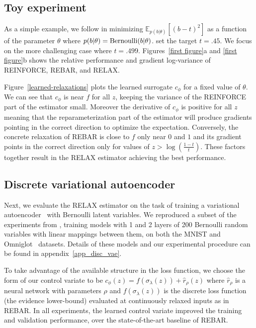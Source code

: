 \documentclass{article}
\newcommand{\RELAX}{{\textnormal{RELAX}}}
\begin{document}
\subsection{Toy experiment}
As a simple example, we follow \citet{tucker2017rebar} in minimizing $\mathbb{E}_{p(b|\theta)}[(b - t)^2]$ as a function of the parameter $\theta$ where {$p(b|\theta) = \textnormal{Bernoulli}(b|\theta)$}.
\citet{tucker2017rebar} set the target $t = .45$.
We focus on the more challenging case where $t = .499$.
Figures~\ref{first figure}a and \ref{first figure}b shows the relative performance and gradient log-variance of REINFORCE, REBAR, and RELAX.


Figure~\ref{learned-relaxations} plots the learned surrogate $c_\phi$ for a fixed value of $\theta$. We can see that $c_\phi$ is near $f$ for all $z$, keeping the variance of the REINFORCE part of the estimator small. Moreover the derivative of $c_\phi$ is positive for all $z$ meaning that the reparameterization part of the estimator will produce gradients pointing in the correct direction to optimize the expectation. Conversely, the concrete relaxation of REBAR is close to $f$ only near $0$ and $1$ and its gradient points in the correct direction only for values of $z > \log (\frac{1-t}{t})$. These factors together result in the RELAX estimator achieving the best performance. 

\subsection{Discrete variational autoencoder}
Next, we evaluate the \RELAX{} estimator on the task of training a variational autoencoder~\citep{kingma2013autoencoding, rezende2014stochastic} with Bernoulli latent variables.
We reproduced a subset of the experiments from \citet{tucker2017rebar}, training models with 1 and 2 layers of 200 Bernoulli random variables with linear mappings between them, on both  the MNIST and Omniglot~\citep{lake2015human} datasets.
Details of these models and our experimental procedure can be found in appendix~\ref{app_disc_vae}.

To take advantage of the available structure in the loss function, we choose the form of our control variate to be $c_\phi(z) = f(\sigma_\lambda(z))+  \hat{r}_\rho(z)$ where $\hat{r}_\rho$ is a neural network with parameters $\rho$ and $f(\sigma_\lambda(z))$ is the discrete loss function (the evidence lower-bound) evaluated at continuously relaxed inputs as in REBAR.  
%
In all experiments, the learned control variate improved the training and validation performance, over the state-of-the-art baseline of REBAR. 
\end{document}
